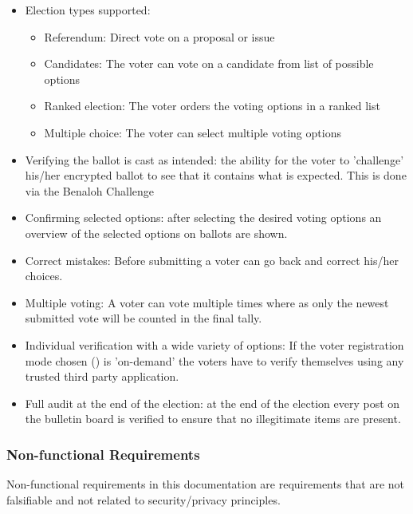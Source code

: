 \begin{itemize}
    \item Election types supported:
    \begin{itemize}
        \item Referendum: Direct vote on a proposal or issue
        \item Candidates: The voter can vote on a candidate from list of possible options
        \item Ranked election: The voter orders the voting options in a ranked list
        \item Multiple choice: The voter can select multiple voting options
    \end{itemize}
    \item Verifying the ballot is cast as intended: the ability for the voter to 'challenge' his/her encrypted ballot to see that it contains what is expected. This is done via the Benaloh Challenge
    \item Confirming selected options: after selecting the desired voting options an overview of the selected options on ballots are shown.
    \item Correct mistakes: Before submitting a voter can go back and correct his/her choices.
    \item Multiple voting: A voter can vote multiple times where as only the newest submitted vote will be counted in the final tally.
    \item Individual verification with a wide variety of options: If the voter registration mode chosen () is 'on-demand' the voters have to verify themselves using any trusted third party application.
    \item Full audit at the end of the election: at the end of the election every post on the bulletin board is verified to ensure that no illegitimate items are present. 
\end{itemize}


\subsubsection{Non-functional Requirements} \label{sec: non-functional requirements}
Non-functional requirements in this documentation are requirements that are not falsifiable and not related to security/privacy principles.

